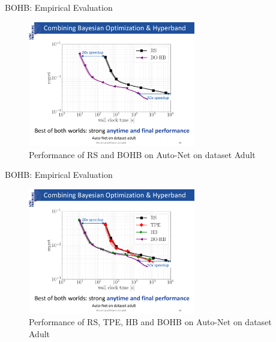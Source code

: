 \begin{frame}{BOHB: Empirical Evaluation}
\begin{figure}
    \centering
    \includegraphics[width=0.65\textwidth]{../w07_hpo_speedup/images/bohb/BOHB_3.pdf}
    \caption{Performance of RS and BOHB on Auto-Net on dataset Adult}
\end{figure}

\end{frame}
\begin{frame}{BOHB: Empirical Evaluation}
\begin{figure}
    \centering
    \includegraphics[width=0.65\textwidth]{../w07_hpo_speedup/images/bohb/BOHB_4.pdf}
    \caption{Performance of RS, TPE, HB and BOHB on Auto-Net on dataset Adult}
\end{figure}

\end{frame}
